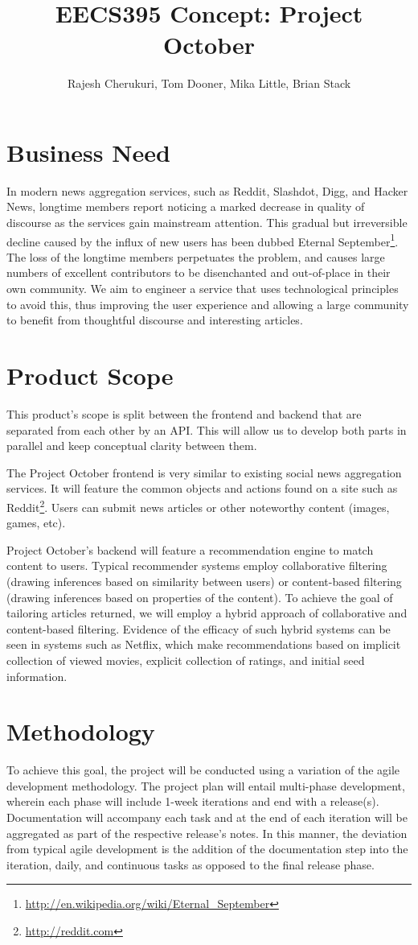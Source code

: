 \documentclass{article}
\author{Rajesh Cherukuri, Tom Dooner, Mika Little, Brian Stack}
\title{EECS395 Concept: Project October}
\begin{document}
\maketitle

\section{Business Need}
In modern news aggregation services, such as Reddit, Slashdot, Digg, and Hacker News, longtime members report noticing a marked decrease in quality of discourse as the services gain mainstream attention.
This gradual but irreversible decline caused by the influx of new users has been dubbed Eternal September\footnote{\url{http://en.wikipedia.org/wiki/Eternal\_September}}.
The loss of the longtime members perpetuates the problem, and causes large numbers of excellent contributors to be disenchanted and out-of-place in their own community.
We aim to engineer a service that uses technological principles to avoid this, thus improving the user experience and allowing a large community to benefit from thoughtful discourse and interesting articles.

\section{Product Scope}
This product's scope is split between the frontend and backend that are separated from each other by an API.
This will allow us to develop both parts in parallel and keep conceptual clarity between them.

The Project October frontend is very similar to existing social news aggregation services.
It will feature the common objects and actions found on a site such as Reddit\footnote{\url{http://reddit.com}}.
Users can submit news articles or other noteworthy content (images, games, etc).

Project October's backend will feature a recommendation engine to match content to users.
Typical recommender systems employ collaborative filtering (drawing inferences based on similarity between users) or content-based filtering (drawing inferences based on properties of the content).
To achieve the goal of tailoring articles returned, we will employ a hybrid approach of collaborative and content-based filtering.
Evidence of the efficacy of such hybrid systems can be seen in systems such as Netflix, which make recommendations based on implicit collection of viewed movies, explicit collection of ratings, and initial seed information.

\section{Methodology}
To achieve this goal, the project will be conducted using a variation of the agile development methodology.
The project plan will entail multi-phase development, wherein each phase will include 1-week  iterations and end with a release(s).
Documentation will accompany each task and at the end of each iteration will be aggregated as part of the respective release’s notes.
In this manner, the deviation from typical agile development is the addition of the documentation step into the iteration, daily, and continuous tasks as opposed to the final release phase.
\end{document}

